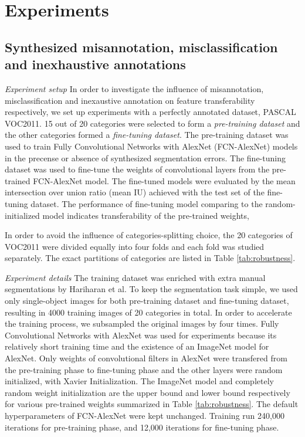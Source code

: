 \section{Experiments}
\label{sec:experiments}

\subsection{Synthesized misannotation, misclassification and inexhaustive annotations}
\label{subsec:robustness}

\noindent
\textit{Experiment setup}
\noindent
In order to investigate the influence of misannotation, misclassification and inexaustive annotation on feature transferability respectively, we set up experiments with a perfectly annotated dataset, PASCAL VOC2011\cite{everingham2015pascal}.
15 out of 20 categories were selected to form a \textit{pre-training dataset} and the other categories formed a \textit{fine-tuning dataset}.
The pre-training dataset was used to train Fully Convolutional Networks with AlexNet (FCN-AlexNet) models in the precense or absence of synthesized segmentation errors.
The fine-tuning dataset was used to fine-tune the weights of convolutional layers from the pre-trained FCN-AlexNet model.
The fine-tuned models were evaluated by the mean intersection over union ratio (mean IU) achieved with the test set of the fine-tuning dataset.
The performance of fine-tuning model comparing to the random-initialized model indicates transferability of the pre-trained weights,

\noindent
In order to avoid the influence of categories-splitting choice, the 20 categories of VOC2011 were divided equally into four folds and each fold was studied separately.
The exact partitions of categories are listed in Table \ref{tab:robustness}.

\noindent \textit{Experiment details}
\noindent
The training dataset was enriched with extra manual segmentations by Hariharan et al.\cite{hariharan2011semantic}
To keep the segmentation task simple, we used only single-object images for both pre-training dataset and fine-tuning dataset, resulting in 4000 training images of 20 categories in total.
In order to accelerate the training process, we subsampled the original images by four times.
Fully Convolutional Networks with AlexNet was used for experiments because its relatively short training time and the existence of an ImageNet model for AlexNet.
Only weights of convolutional filters in AlexNet were transfered from the pre-training phase to fine-tuning phase and the other layers were random initialized, with Xavier Initialization.
The ImageNet model and completely random weight initialization are the upper bound and lower bound respectively for various pre-trained weights summarized in Table \ref{tab:robustness}.
The default hyperparameters of FCN-AlexNet\cite{long2015fully} were kept unchanged.
Training run 240,000 iterations for pre-training phase, and 12,000 iterations for fine-tuning phase.


